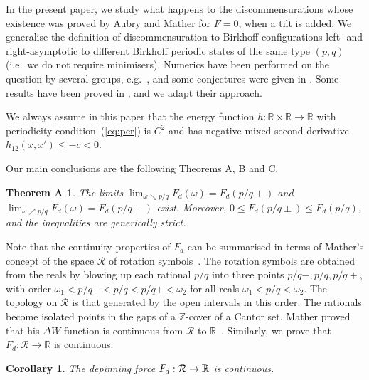 \documentclass[12pt]{article}
\newcommand{\R}{\mathbb{R}}
\newcommand{\Z}{\mathbb{Z}}
\newcounter{number}
\newtheorem*{thmA}{Theorem A}
\newtheorem{corollary}{Corollary}
\newcommand{\begco}{\begin{corollary}\hspace{1em}}
\newcommand{\eco}{\end{corollary}
   \addtocounter{number}{1}}
\newcommand{\refer}[1]{~(\ref{#1})}
\begin{document}
In the present paper, we study what happens to the discommensurations whose existence was proved by Aubry and Mather for $F=0$, when a tilt is added.
We generalise the definition of discommensuration to Birkhoff configurations left- and right-asymptotic to different Birkhoff periodic states of the same type $(p,q)$ (i.e.~we do not require minimisers).
Numerics have been performed on the question by several groups, e.g.~\cite{FM}, and some conjectures were given in \cite{BM}.
Some results have been proved in \cite{QW1,QW2},
and we adapt their approach.

We always assume in this paper that the energy function $h: \R\times\R \to \R$ with periodicity condition\refer{eq:per} is $C^2$ and has negative mixed second derivative $h_{12}(x,x') \le -c < 0$.

Our main conclusions are the following Theorems A, B and C.

\begin{thmA}\label{thmA}
The limits $ \lim_{\omega \searrow p/q} F_d(\omega) =F_d(p/q+)$ and $\lim_{\omega \nearrow p/q}F_d(\omega)=F_d(p/q-)$ exist. Moreover, $0\le F_d(p/q\pm) \le F_d(p/q)$, and the inequalities are generically strict.
\end{thmA}

Note that the continuity properties of $F_d$ can be summarised in terms of Mather's concept of the space $\mathcal{R}$ of rotation symbols~\cite{Mat3}.  The rotation symbols are obtained from the reals by blowing up each rational $p/q$ into three points $p/q-, p/q, p/q+$, with order $\omega_1 < p/q- < p/q < p/q+ < \omega_2$ for all reals $\omega_1 < p/q < \omega_2$.  The topology on $\mathcal{R}$ is that generated by the open intervals in this order.  The rationals become isolated points in the gaps of a $\Z$-cover of a Cantor set.  Mather proved that his $\Delta W$ function is continuous from $\mathcal{R}$ to $\R$~\cite{Mat2}.  Similarly, we prove that $F_d: \mathcal{R} \to \R$ is continuous.

\begco\label{co:conti}
The depinning force $F_d:{\cal R}\to\R$ is continuous.
\eco
\end{document}
